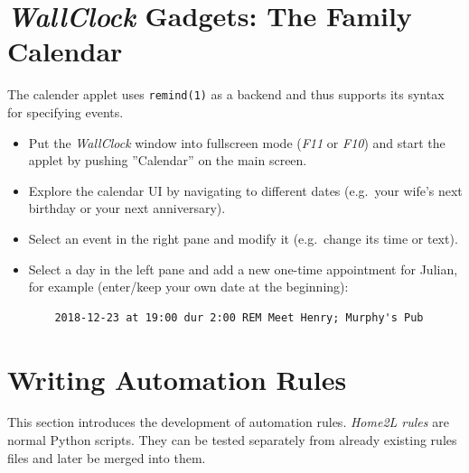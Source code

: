 \documentclass[12pt,english,parskip=half]{scrreprt}
\begin{document}
\section{\emph{WallClock} Gadgets: The Family Calendar}
\label{sec:tutorial-calendar}


The calender applet uses \texttt{remind(1)} as a backend and thus
supports its syntax for specifying events.

\begin{itemize}[$\blacktriangleright$]
\item
  Put the \emph{WallClock} window into fullscreen mode (\emph{F11} or \emph{F10})
  and start the applet by pushing ''Calendar'' on the main screen.
\item
  Explore the calendar UI by navigating to different dates (e.g.~your wife's
  next birthday or your next anniversary).
\item
  Select an event in the right pane and modify it (e.g.~change its time
  or text).
\item
  Select a day in the left pane and add a new one-time appointment for
  Julian, for example (enter/keep your own date at the beginning):
  \begin{lstlisting}
    2018-12-23 at 19:00 dur 2:00 REM Meet Henry; Murphy's Pub
  \end{lstlisting}
\end{itemize}





\section{Writing Automation Rules}
\label{sec:tutorial-rules}


This section introduces the development of automation rules. \emph{Home2L rules}
are normal Python scripts. They can be tested separately from already
existing rules files and later be merged into them.
\end{document}
